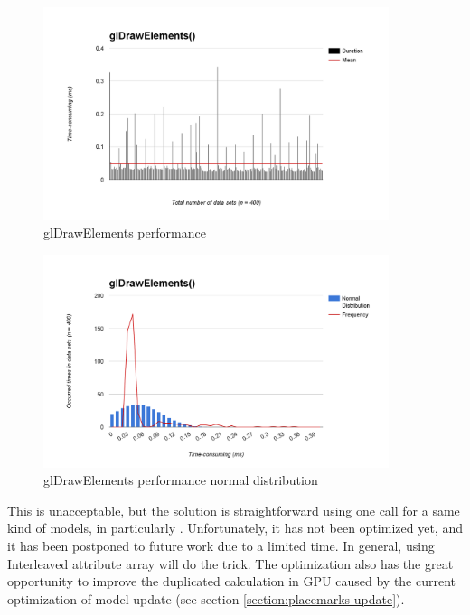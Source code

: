 \begin{figure}[H]
	\caption{glDrawElements performance}
	\label{fig:glDrawElements-performance}
	\centering
	\includegraphics[width=0.9\textwidth, keepaspectratio]{Figures/glDrawElements-performance.png}
	\decoRule
\end{figure}

\begin{figure}[H]
	\caption{glDrawElements performance normal distribution}
	\label{fig:glDrawElements-performance-normal-distribution}
	\centering
	\includegraphics[width=0.9\textwidth, keepaspectratio]{Figures/glDrawElements-performance-normal-distribution.png}
	\decoRule
\end{figure}

This is unacceptable, but the solution is straightforward using one  call for a same kind of models, in particularly . Unfortunately, it has not been optimized yet, and it has been postponed to future work due to a limited time. In general, using Interleaved attribute array will do the trick. The optimization also has the great opportunity to improve the duplicated calculation in GPU caused by the current optimization of model update (see section \ref{section:placemarks-update}).

